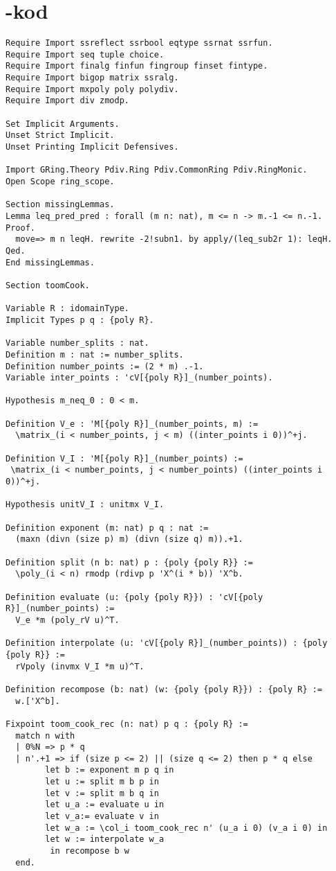 \section{\coq{}-kod}
\label{sec:coqkod}
\begin{lstlisting}
Require Import ssreflect ssrbool eqtype ssrnat ssrfun.
Require Import seq tuple choice.
Require Import finalg finfun fingroup finset fintype.
Require Import bigop matrix ssralg.
Require Import mxpoly poly polydiv.
Require Import div zmodp.

Set Implicit Arguments.
Unset Strict Implicit.
Unset Printing Implicit Defensives.

Import GRing.Theory Pdiv.Ring Pdiv.CommonRing Pdiv.RingMonic.
Open Scope ring_scope.

Section missingLemmas.
Lemma leq_pred_pred : forall (m n: nat), m <= n -> m.-1 <= n.-1.
Proof.
  move=> m n leqH. rewrite -2!subn1. by apply/(leq_sub2r 1): leqH.
Qed.
End missingLemmas.

Section toomCook.

Variable R : idomainType.
Implicit Types p q : {poly R}.

Variable number_splits : nat.
Definition m : nat := number_splits.
Definition number_points := (2 * m) .-1.
Variable inter_points : 'cV[{poly R}]_(number_points).

Hypothesis m_neq_0 : 0 < m.

Definition V_e : 'M[{poly R}]_(number_points, m) :=
  \matrix_(i < number_points, j < m) ((inter_points i 0))^+j.

Definition V_I : 'M[{poly R}]_(number_points) :=
 \matrix_(i < number_points, j < number_points) ((inter_points i 0))^+j.

Hypothesis unitV_I : unitmx V_I.

Definition exponent (m: nat) p q : nat :=
  (maxn (divn (size p) m) (divn (size q) m)).+1.

Definition split (n b: nat) p : {poly {poly R}} :=
  \poly_(i < n) rmodp (rdivp p 'X^(i * b)) 'X^b.

Definition evaluate (u: {poly {poly R}}) : 'cV[{poly R}]_(number_points) :=
  V_e *m (poly_rV u)^T.

Definition interpolate (u: 'cV[{poly R}]_(number_points)) : {poly {poly R}} :=
  rVpoly (invmx V_I *m u)^T.

Definition recompose (b: nat) (w: {poly {poly R}}) : {poly R} :=
  w.['X^b].

Fixpoint toom_cook_rec (n: nat) p q : {poly R} :=
  match n with
  | 0%N => p * q
  | n'.+1 => if (size p <= 2) || (size q <= 2) then p * q else
        let b := exponent m p q in
        let u := split m b p in
        let v := split m b q in
        let u_a := evaluate u in
        let v_a:= evaluate v in
        let w_a := \col_i toom_cook_rec n' (u_a i 0) (v_a i 0) in
        let w := interpolate w_a
         in recompose b w
  end.


\end{lstlisting}
